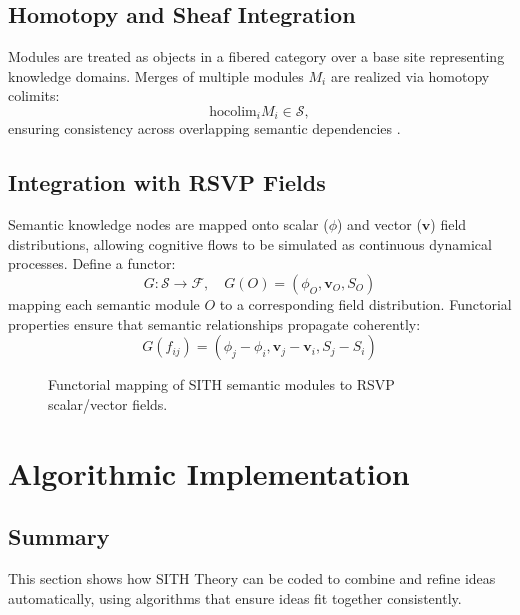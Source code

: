 \documentclass[11pt,oneside]{memoir}
\theoremstyle{plain}
\newcommand{\F}{\mathcal{F}}
\newcommand{\Sfun}{\mathcal{S}}
\begin{document}
\subsection{Homotopy and Sheaf Integration}
Modules are treated as objects in a fibered category over a base site representing knowledge domains. Merges of multiple modules \(M_i\) are realized via homotopy colimits:
\begin{equation}
    \text{hocolim}_i M_i \in \Sfun,
\end{equation}
ensuring consistency across overlapping semantic dependencies \cite{lurie}.

\subsection{Integration with RSVP Fields}
Semantic knowledge nodes are mapped onto scalar (\(\phi\)) and vector (\(\mathbf{v}\)) field distributions, allowing cognitive flows to be simulated as continuous dynamical processes. Define a functor:
\begin{equation}
    G: \Sfun \to \F, \quad G(O) = (\phi_O, \mathbf{v}_O, S_O)
\end{equation}
mapping each semantic module \(O\) to a corresponding field distribution. Functorial properties ensure that semantic relationships propagate coherently:
\begin{equation}
    G(f_{ij}) = (\phi_j - \phi_i, \mathbf{v}_j - \mathbf{v}_i, S_j - S_i)
\end{equation}

\begin{figure}[h]
\centering
{}
\caption{Functorial mapping of SITH semantic modules to RSVP scalar/vector fields.}
\label{fig:sith_rsvp_overlay}
\end{figure}

\section{Algorithmic Implementation}
\subsection{Summary}
This section shows how SITH Theory can be coded to combine and refine ideas automatically, using algorithms that ensure ideas fit together consistently.
\end{document}
